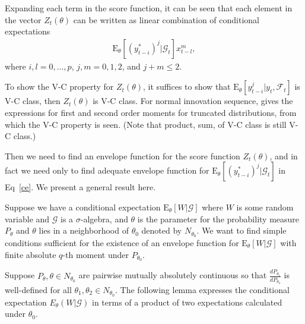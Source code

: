 \documentclass[a4paper,12pt]{article}
\newcommand{\E}{\mathop{\mathbb{E}}}
\def \E{\mbox{E}}
\def \F {\mathcal{F}}
\def \G {\mathcal{G}}
\begin{document}
Expanding each term in the score function, it can be seen that each element in the vector $Z_t(\theta)$ can be written as linear combination of conditional expectations 
\begin{align}
  \E_\theta\left[ (y_{t-i}^*)^j|\G_t \right]x_{t-l}^m,\label{ce}
\end{align}
where $i,l=0,\dots,p$, $j,m=0,1,2$, and $j+m\le 2$.

To show the V-C property for $Z_t(\theta)$,
it suffices to show that 
$\E_\theta\left[ y_{t-i}^j|y_t,\F_t \right]$ is V-C class, then $Z_t(\theta)$ is V-C class.
For normal innovation sequence, \citet{Tallis1961} gives the expressions for first and second order moments for truncated distributions, from which the V-C property is seen.  
(Note that product, sum, of V-C class is still V-C class.)

Then we need to find an envelope function for the score function $Z_{t}(\theta)$, and in fact we need only to find adequate envelope function for $\E_\theta\left[ (y_{t-i}^*)^j|\G_t \right]$ in Eq~\eqref{ce}. We present a general result here.

Suppose we have a conditional expectation $\E_\theta\left[ W|\G \right]$ where $W$ is some random variable and $\G$ is a $\sigma$-algebra, and $ \theta $ is the parameter for the probability measure $P_{\theta}$ and $\theta$ lies in a neighborhood of $\theta_0$ denoted by $N_{\theta_0}$.
We want to find simple conditions sufficient for the existence of an envelope function for $\E_{\theta}\left[ W|\G \right]$ with finite absolute $q$-th moment under  $P_{\theta_0}$.

Suppose $P_\theta, \theta\in N_{\theta_0}$ are pairwise mutually absolutely continuous 
so that  $\frac{dP_{\theta_1}}{dP_{\theta_2}}$ is well-defined for all $\theta_1, \theta_2 \in N_{\theta_0}$.
The following lemma expresses the conditional expectation $E_\theta(W|\G)$ in terms of a product of two expectations calculated under $\theta_0$. 
\end{document}
